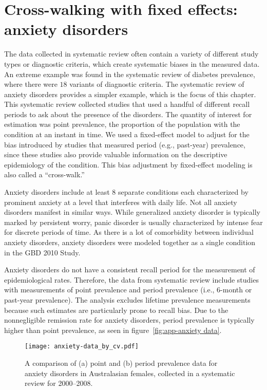 \chapter{Cross-walking with fixed effects: anxiety disorders}
\label{applications-efx_study_level}

The data collected in systematic review often contain a variety of
different study types or diagnostic criteria, which create systematic
biases in the measured data.  An extreme example was found in the
systematic review of diabetes prevalence, where there were $18$ variants
of diagnostic criteria.  The systematic review of anxiety disorders
provides a simpler example, which is the focus of this chapter. This
systematic review collected studies that used a handful of different
recall periods to ask about the presence of the disorders. The quantity
of interest for estimation was point prevalence, the
proportion of the population with the condition at an instant in time.
We used a fixed-effect model to adjust for the bias introduced by
studies that measured period (e.g., past-year) prevalence, since these studies also provide
valuable information on the descriptive epidemiology of the condition.
This bias adjustment by fixed-effect modeling is also called a
``cross-walk.''

Anxiety disorders include at least $8$ separate conditions each
characterized by prominent anxiety at a level that interferes with
daily life.  Not all anxiety disorders manifest in similar ways.
While generalized anxiety disorder is typically marked by persistent
worry, panic disorder is usually characterized by intense fear for
discrete periods of time. \cite{american_psychiatric_association_diagnostic_2000} As there is
a lot of comorbidity between individual anxiety disorders, anxiety
disorders were modeled together as a single condition in the GBD 2010
Study.

Anxiety disorders do not have a consistent recall period for the
measurement of epidemiological rates.  Therefore, the data from
systematic review include studies with measurements of point prevalence
and period prevalence (i.e., $6$-month or past-year prevalence).  The
analysis excludes lifetime prevalence measurements because such estimates
are particularly prone to recall bias.  Due to the nonnegligible
remission rate for anxiety disorders, period prevalence is typically
higher than point prevalence, as seen in figure~\ref{fig:app-anxiety
  data}.

    \begin{figure}[h]
        \begin{center}
            \texttt{[image: anxiety-data\_by\_cv.pdf]}
            \caption[Systematic review data of anxiety disorders.]{A comparison of (a) point and (b) period prevalence data
              for anxiety disorders in Australasian females, collected in a systematic review for
              2000--2008.}
            \label{fig:app-anxiety data}
        \end{center}
    \end{figure}


